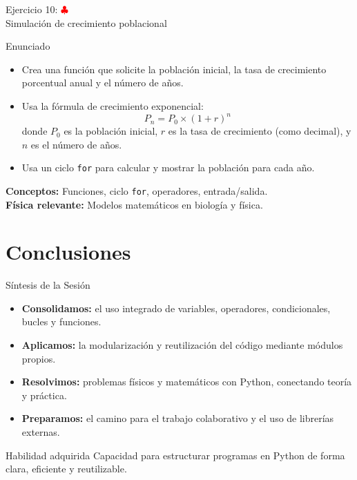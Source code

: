 \documentclass[10pt]{beamer}
\begin{document}
\begin{frame}{Ejercicio 10: \hfill \textcolor{red}{$\clubsuit$} \\ Simulación de crecimiento poblacional}
  \begin{block}{Enunciado}
    \begin{itemize}
      \item Crea una función que solicite la población inicial, la tasa de crecimiento porcentual anual y el número de años.
      \item Usa la fórmula de crecimiento exponencial:
        \[
        P_{n} = P_0 \times (1 + r)^n
        \]
        donde \(P_0\) es la población inicial, \(r\) es la tasa de crecimiento (como decimal), y \(n\) es el número de años.
      \item Usa un ciclo \texttt{for} para calcular y mostrar la población para cada año.
    \end{itemize}
  \end{block}
  \textbf{Conceptos:} Funciones, ciclo \texttt{for}, operadores, entrada/salida.\\
  \textbf{Física relevante:} Modelos matemáticos en biología y física.
\end{frame}


\section{Conclusiones}


\begin{frame}{Síntesis de la Sesión}
  \begin{itemize}
    \item \textbf{Consolidamos:} el uso integrado de variables, operadores, condicionales, bucles y funciones.
    \item \textbf{Aplicamos:} la modularización y reutilización del código mediante módulos propios.
    \item \textbf{Resolvimos:} problemas físicos y matemáticos con Python, conectando teoría y práctica.
    \item \textbf{Preparamos:} el camino para el trabajo colaborativo y el uso de librerías externas.
  \end{itemize}
  \begin{block}{Habilidad adquirida}
    Capacidad para estructurar programas en Python de forma clara, eficiente y reutilizable.
  \end{block}
\end{frame}
\end{document}
